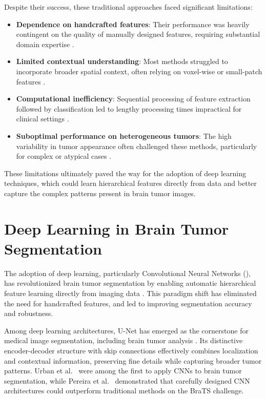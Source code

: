 Despite their success, these traditional approaches faced significant limitations:

\begin{itemize}
  \item \textbf{Dependence on handcrafted features}: Their performance was heavily contingent on the quality of manually designed features, requiring substantial domain expertise \cite{Pandit2019}.
  \item \textbf{Limited contextual understanding}: Most methods struggled to incorporate broader spatial context, often relying on voxel-wise or small-patch features \cite{Havaei2017}.
  \item \textbf{Computational inefficiency}: Sequential processing of feature extraction followed by classification led to lengthy processing times impractical for clinical settings \cite{Sompong2017}.
  \item \textbf{Suboptimal performance on heterogeneous tumors}: The high variability in tumor appearance often challenged these methods, particularly for complex or atypical cases \cite{Menze2015}.
\end{itemize}

These limitations ultimately paved the way for the adoption of deep learning techniques, which could learn hierarchical features directly from data and better capture the complex patterns present in brain tumor images.

\section{Deep Learning in Brain Tumor Segmentation}

The adoption of deep learning, particularly Convolutional Neural Networks (), has revolutionized brain tumor segmentation by enabling automatic hierarchical feature learning directly from imaging data \cite{Havaei2017}. This paradigm shift has eliminated the need for handcrafted features, and led to improving segmentation accuracy and robustness.

Among deep learning architectures, U-Net has emerged as the cornerstone for medical image segmentation, including brain tumor analysis \cite{Ronneberger2015}. Its distinctive encoder-decoder structure with skip connections effectively combines localization and contextual information, preserving fine details while capturing broader tumor patterns. Urban et al.\ \cite{Urban2014} were among the first to apply CNNs to brain tumor segmentation, while Pereira et al.\ \cite{Pereira2016} demonstrated that carefully designed CNN architectures could outperform traditional methods on the BraTS challenge.

